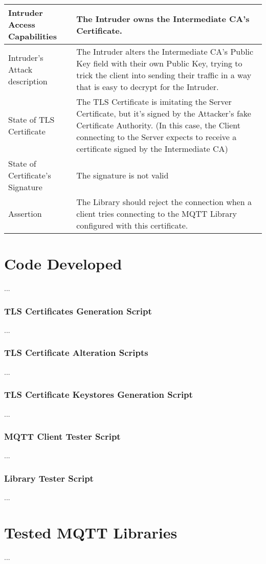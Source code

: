 \documentclass[binding=0.6cm,noexaminfo]{sapthesis}
\begin{document}
\begin{center}
\begin{tabular}{| p{6cm} | p{6cm} |}
\hline
Intruder Access Capabilities & The Intruder owns the Intermediate CA’s Certificate. \\
\hline
Intruder’s Attack description & The Intruder alters the Intermediate CA’s Public Key field with their own Public Key, trying to trick the client into sending their traffic in a way that is easy to decrypt for the Intruder. \\
\hline
State of TLS Certificate & The TLS Certificate is imitating the Server Certificate, but it’s signed by the Attacker’s fake Certificate Authority. (In this case, the Client connecting to the Server expects to receive a certificate signed by the Intermediate CA) \\
\hline
State of Certificate’s Signature & The signature is not valid \\
\hline
Assertion & The Library should reject the connection when a client tries connecting to the MQTT Library configured with this certificate. \\
\hline
\end{tabular}
\end{center}

\chapter{Code Developed} ...
\subsection{TLS Certificates Generation Script} ...
\subsection{TLS Certificate Alteration Scripts} ...
\subsection{TLS Certificate Keystores Generation Script} ...
\subsection{MQTT Client Tester Script} ...
\subsection{Library Tester Script} ...
\chapter{Tested MQTT Libraries} ...
\end{document}

